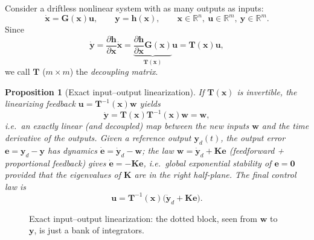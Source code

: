 \documentclass[11pt,a4paper]{article}
\newcommand{\R}{\mathbb{R}}
\newcommand{\vect}[1]{\bm{#1}}
\theoremstyle{plain}
\newtheorem{proposition}[theorem]{Proposition}
\theoremstyle{definition}
\theoremstyle{remark}
\begin{document}
Consider a driftless nonlinear system with as many outputs as inputs:
\[
\dot{\vect x}=\vect G(\vect x)\vect u,\qquad \vect y=\vect h(\vect x),\qquad \vect x\in\R^n,\ \vect u\in\R^m,\ \vect y\in\R^m .
\]
Since
\[
\dot{\vect y}=\frac{\partial\vect h}{\partial\vect x}\dot{\vect x}=\underbrace{\frac{\partial\vect h}{\partial\vect x}\vect G(\vect x)}_{\vect T(\vect x)}\vect u=\vect T(\vect x)\vect u,
\]
we call $\vect T$ ($m\times m$) the \emph{decoupling matrix}.

\begin{proposition}[Exact input--output linearization]\label{prop:io}
If $\vect T(\vect x)$ is invertible, the \emph{linearizing feedback} $\vect u=\vect T^{-1}(\vect x)\vect w$ yields
\[
\dot{\vect y}=\vect T(\vect x)\vect T^{-1}(\vect x)\vect w=\vect w,
\]
i.e.\ an exactly linear (and decoupled) map between the new inputs $\vect w$ and the time derivative of the outputs. Given a reference output $\vect y_d(t)$, the output error $\vect e=\vect y_d-\vect y$ has dynamics $\dot{\vect e}=\dot{\vect y}_d-\vect w$; the law $\vect w=\dot{\vect y}_d+\vect K\vect e$ (feedforward + proportional feedback) gives $\dot{\vect e}=-\vect K\vect e$, i.e.\ \emph{global exponential stability} of $\vect e=\vect 0$ provided that the eigenvalues of $\vect K$ are in the right half-plane. The final control law is
\begin{equation}\label{eq:iolaw}
\vect u=\vect T^{-1}(\vect x)\bigl(\dot{\vect y}_d+\vect K\vect e\bigr).
\end{equation}
\end{proposition}

\begin{figure}[H]
\centering
{}
\caption{Exact input--output linearization: the dotted block, seen from $\vect w$ to $\vect y$, is just a bank of integrators.}
\end{figure}
\end{document}
